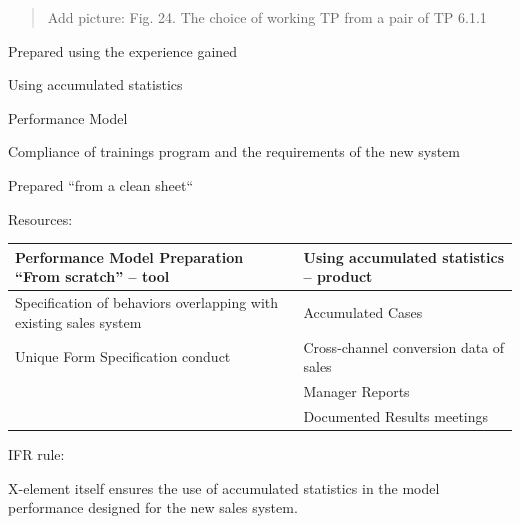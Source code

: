 \documentclass[11pt,a4paper]{book}
\newcommand{\addpicture}[1]{
  \begin{quote} Add picture: #1\end{quote}
}
\begin{document}

\addpicture{Fig. 24. The choice of working TP from a pair of TP 6.1.1}

Prepared using the experience gained

Using accumulated statistics

Performance Model

Compliance of trainings program and the requirements of the new system

Prepared “from a clean sheet“


Resources:

\begin{center}
  \begin{tabular}{|p{}|p{}|}\hline 
    Performance Model Preparation “From scratch” -- tool & Using accumulated
    statistics -- product\\\hline
    Specification of behaviors overlapping with existing sales system &
    Accumulated Cases\\\hline
    Unique Form Specification conduct & Cross-channel conversion data of
    sales\\\hline
    & Manager Reports\\\hline
    & Documented Results meetings\\\hline
  \end{tabular}
\end{center}

IFR rule:

X-element itself ensures the use of accumulated statistics in the model
performance designed for the new sales system.
\end{document}
